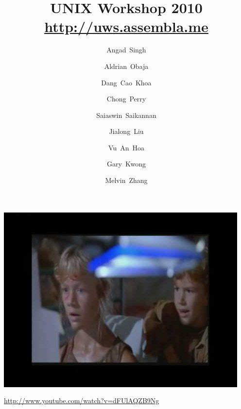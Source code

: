 \usepackage{graphicx} 
\usepackage{verbatim}
\usepackage{hyperref}
\hypersetup{
    colorlinks,%
    citecolor=black,%
    filecolor=black,%
    linkcolor=black,%
    urlcolor=blue
}

\graphicspath{{../figures/}}


\newcommand{\ftitle}[1]{\frametitle<presentation>{#1}}
\newcommand{\cmd}[1]{\begin{quote}{\tt #1}\end{quote}}
\newcommand{\sunfire}{\texttt{sunfire}}

\title{UNIX Workshop 2010\\\url{http://uws.assembla.me}}
\author{
Angad~Singh \and 
Aldrian~Obaja \and
Dang~Cao~Khoa \and
Chong~Perry \and
Saiaswin~Saikannan \and
Jialong~Liu\\ \and
Vu~An~Hoa \and
Gary~Kwong \and
Melvin~Zhang
}



\maketitle


\begin{frame}
\begin{center}
\includegraphics[width=\textwidth]{jurassic_park}

\url{http://www.youtube.com/watch?v=dFUlAQZB9Ng}
\end{center}
\end{frame}

